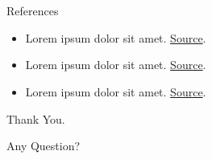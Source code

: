 \documentclass[aspectratio=169]{beamer}  %
\begin{document}

\bulletoff\section*{}
\begin{frame}{References}
\begin{itemize}
    \item Lorem ipsum dolor sit amet. \href{<>}{Source}. 
    \item Lorem ipsum dolor sit amet. \href{<>}{Source}. 
    \item Lorem ipsum dolor sit amet. \href{<>}{Source}. 
\end{itemize}
\end{frame}


\begin{frame}[noframenumbering]
\Huge\centerline{Thank You.}
\huge\centerline{Any Question?}
\end{frame}

\end{document}

